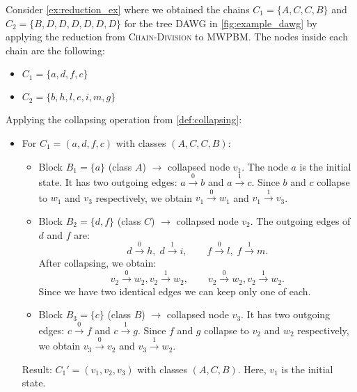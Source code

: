 \begin{example}
    Consider \cref{ex:reduction_ex} where we obtained the chains $C_1 = \{A,C,C,B\}$ and $C_2 = \{B,D,D,D,D,D,D\}$ for the tree DAWG in \cref{fig:example_dawg} by applying the reduction from \textsc{Chain-Division} to \textsc{MWPBM}. The nodes inside each chain are the following:
    \begin{itemize}
        \item $C_1 = \{a,d,f,c\}$
        \item $C_2 = \{b,h,l,e,i,m,g\}$
    \end{itemize}
    
    Applying the collapsing operation from \cref{def:collapsing}:
    \begin{itemize}
        \item For $C_1 = (a,d,f,c)$ with classes $(A,C,C,B)$: 
        \begin{itemize}
            \item Block $B_1 = \{a\}$ (class $A$) $\rightarrow$ collapsed node $v_1$. The node $a$ is the initial state. It has two outgoing edges: $a \xrightarrow{0} b$ and $a \xrightarrow{1} c$. Since $b$ and $c$ collapse to $w_1$ and $v_3$ respectively, we obtain $v_1 \xrightarrow{0} w_1$ and $v_1 \xrightarrow{1} v_3$.
            \item Block $B_2 = \{d,f\}$ (class $C$) $\rightarrow$ collapsed node $v_2$. The outgoing edges of $d$ and $f$ are:
            \[
                d \xrightarrow{0} h,\; d \xrightarrow{1} i,\qquad
                f \xrightarrow{0} l,\; f \xrightarrow{1} m.
            \]
            After collapsing, we obtain:
            \[
                v_2 \xrightarrow{0} w_2, v_2 \xrightarrow{1} w_2,\qquad v_2 \xrightarrow{0} w_2, v_2 \xrightarrow{1} w_2.
            \]
            Since we have two identical edges we can keep only one of each.
            \item Block $B_3 = \{c\}$ (class $B$) $\rightarrow$ collapsed node $v_3$. It has two outgoing edges: $c \xrightarrow{0} f$ and $c \xrightarrow{1} g$. Since $f$ and $g$ collapse to $v_2$ and $w_2$ respectively, we obtain $v_3 \xrightarrow{0} v_2$ and $v_3 \xrightarrow{1} w_2$.
        \end{itemize}
        Result: $C_1' = (v_1, v_2, v_3)$ with classes $(A, C, B)$. Here, $v_1$ is the initial state.
        

\end{itemize}
\end{example}
